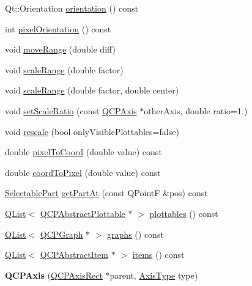\begin{DoxyCompactItemize}
\item 
Qt\+::\+Orientation \hyperlink{class_q_c_p_axis_ab988ef4538e2655bb77bd138189cd42e}{orientation} () const
\item 
int \hyperlink{class_q_c_p_axis_a45c45bed7e5666683b8d56afa66fa51f}{pixel\+Orientation} () const
\item 
void \hyperlink{class_q_c_p_axis_a18f3a68f2b691af1fd34b6593c886630}{move\+Range} (double diff)
\item 
void \hyperlink{class_q_c_p_axis_a31d18ddf3a4f21ceb077db8ae5b69856}{scale\+Range} (double factor)
\item 
void \hyperlink{class_q_c_p_axis_a7072ff96fe690148f1bbcdb4f773ea1c}{scale\+Range} (double factor, double center)
\item 
void \hyperlink{class_q_c_p_axis_af4bbd446dcaee5a83ac30ce9bcd6e125}{set\+Scale\+Ratio} (const \hyperlink{class_q_c_p_axis}{Q\+C\+P\+Axis} $\ast$other\+Axis, double ratio=1.)
\item 
void \hyperlink{class_q_c_p_axis_a499345f02ebce4b23d8ccec96e58daa9}{rescale} (bool only\+Visible\+Plottables=false)
\item 
double \hyperlink{class_q_c_p_axis_a536ef8f624cac59b6b6fdcb495723c57}{pixel\+To\+Coord} (double value) const
\item 
double \hyperlink{class_q_c_p_axis_af15d1b3a7f7e9b53d759d3ccff1fe4b4}{coord\+To\+Pixel} (double value) const
\item 
\hyperlink{class_q_c_p_axis_abee4c7a54c468b1385dfce2c898b115f}{Selectable\+Part} \hyperlink{class_q_c_p_axis_a22ab2d71d7341b9b3974c0dd10619af2}{get\+Part\+At} (const Q\+PointF \&pos) const
\item 
\hyperlink{class_q_list}{Q\+List}$<$ \hyperlink{class_q_c_p_abstract_plottable}{Q\+C\+P\+Abstract\+Plottable} $\ast$ $>$ \hyperlink{class_q_c_p_axis_ac5e0f6f65c75efb5fd32275d6e4ef0d6}{plottables} () const
\item 
\hyperlink{class_q_list}{Q\+List}$<$ \hyperlink{class_q_c_p_graph}{Q\+C\+P\+Graph} $\ast$ $>$ \hyperlink{class_q_c_p_axis_ad590c0da223697a2727f97a520870fec}{graphs} () const
\item 
\hyperlink{class_q_list}{Q\+List}$<$ \hyperlink{class_q_c_p_abstract_item}{Q\+C\+P\+Abstract\+Item} $\ast$ $>$ \hyperlink{class_q_c_p_axis_a42761bc68e2f3a9f68549d45b73f705b}{items} () const
\item 
\mbox{\label{class_q_c_p_axis_ac62c042968bae0e6d474fcfc57c9b71f}} 
{\bfseries Q\+C\+P\+Axis} (\hyperlink{class_q_c_p_axis_rect}{Q\+C\+P\+Axis\+Rect} $\ast$parent, \hyperlink{class_q_c_p_axis_ae2bcc1728b382f10f064612b368bc18a}{Axis\+Type} type)

\end{DoxyCompactItemize}
